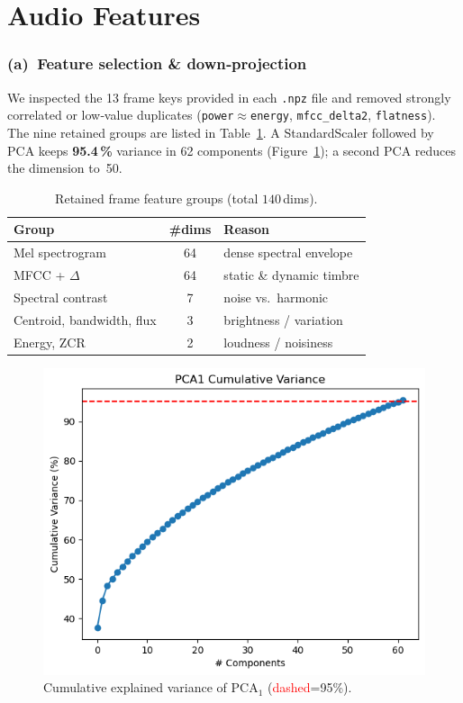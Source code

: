 \documentclass{article}
\begin{document}
\maketitle



\section{Audio Features}   

\subsubsection{(a) Feature selection \& down‑projection}  %
We inspected the 13 frame keys provided in each \texttt{.npz} file and removed
strongly correlated or low‑value duplicates (\texttt{power}$\approx$\texttt{energy}, 
\texttt{mfcc\_delta2}, \texttt{flatness}).  
The nine retained groups are listed in Table~\ref{tab:feat}.  
A StandardScaler followed by PCA keeps \textbf{95.4\,\%} variance in 62
components (Figure~\ref{fig:pca}); a second PCA reduces the dimension to~50.

\begin{table}[h]
	\caption{Retained frame feature groups (total $140$\,dims).}
	\label{tab:feat}
	\centering
	\begin{tabular}{lcl}
		\toprule
		Group & \#dims & Reason \\ \midrule
		Mel spectrogram            & 64 & dense spectral envelope \\
		MFCC + $\Delta$            & 64 & static \& dynamic timbre \\
		Spectral contrast          & 7  & noise vs.\ harmonic      \\
		Centroid, bandwidth, flux  & 3  & brightness / variation   \\
		Energy, ZCR                & 2  & loudness / noisiness     \\ \bottomrule
	\end{tabular}
\end{table}

\begin{figure}[h]
	\centering
	\includegraphics[width=.55\linewidth]{figs_tang/03_pca_cumulative_variance.png}
	\caption{Cumulative explained variance of PCA$_1$ 
		(\textcolor{red}{dashed}=95\%).}
	\label{fig:pca}
\end{figure}
\end{document}
